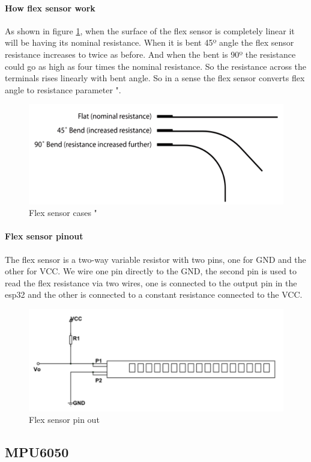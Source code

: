 \paragraph{How flex sensor work}
As shown in figure \ref{fig:flex-cases}, when the surface of the flex sensor is completely linear it will be having its nominal resistance. When it is bent 45º angle the flex sensor resistance increases to twice as before. And when the bent is 90º the resistance could go as high as four times the nominal resistance. So the resistance across the terminals rises linearly with bent angle. So in a sense the flex sensor converts flex angle to resistance parameter "\cite{flex}.
\begin{figure}[h]
	\centering
	\includegraphics[width=0.5\linewidth]{images/flex-cases}
	\caption{Flex sensor cases "\cite{flex}}
	\label{fig:flex-cases}
\end{figure}
\paragraph{Flex sensor pinout}
The flex sensor is a two-way variable resistor with two pins, one for GND and the other for VCC. We wire one pin directly to the GND, the second pin is used to read the flex resistance via two wires, one is connected to the output pin in the esp32 and the other is connected to a constant resistance connected to the VCC.
\begin{figure}[h]
	\centering
	\includegraphics[width=0.5\linewidth]{images/flex-pinout}
	\caption{Flex sensor pin out}
	\label{fig:flex-pinout}
\end{figure}
\subsection{MPU6050}
